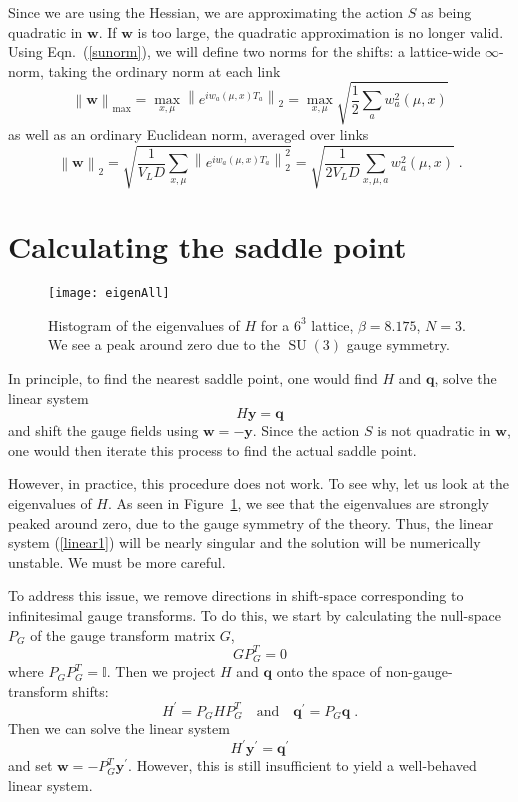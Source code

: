 \documentclass[preprint,aps,prd]{revtex4-2}
\newcommand{\be}{\begin{equation}}
\newcommand{\eq}{\end{equation}}
\DeclareMathOperator{\SU}{SU}
\begin{document}
Since we are using the Hessian, we are approximating
the action $S$ as being quadratic in $\mathbf{w}$.  If $\mathbf{w}$
is too large, the quadratic approximation is no longer valid.
Using Eqn.~(\ref{sunorm}), we will define two norms for the shifts:
a lattice-wide $\infty$-norm, taking the ordinary norm at each link
\be
\left\lVert \mathbf{w}\right\rVert_{\mathrm{max}} =
     \max_{x,\mu} \left\lVert e^{i w_{a}(\mu, x) T_a} \right\rVert_2
     = \max_{x,\mu} \sqrt{\frac{1}{2}\sum_a w_a^2(\mu, x)}
\eq
as well as an ordinary Euclidean norm, averaged over links
\be
\left\lVert \mathbf{w}\right\rVert_2 =
      \sqrt{\frac{1}{V_L D} \sum_{x, \mu}
        \left\lVert e^{i w_{a}(\mu, x) T_a} \right\rVert_2^2}
     = \sqrt{\frac{1}{2 V_L D} \sum_{x, \mu, a} w_a^2(\mu, x)}
        \; .
\eq


\section{Calculating the saddle point}
\label{saddle}

\begin{figure}
\texttt{[image: eigenAll]}
\caption{Histogram of the eigenvalues of $H$ for a $6^3$ lattice,
  $\beta = 8.175$, $N=3$.  We see a peak around zero due to the
  $\SU(3)$ gauge symmetry.
  \label{eigenAll}}
\end{figure}

In principle, to find the nearest saddle point, one would
find $H$ and $\mathbf{q}$, solve the linear system
\be
    H \mathbf{y} = \mathbf{q} \label{linear1}
\eq
and shift the gauge fields using $\mathbf{w} = -\mathbf{y}$.
Since the action $S$ is not quadratic in $\mathbf{w}$, one
would then iterate this process to find the actual saddle point.

However, in practice, this procedure does not work.  To see why, let us
look at the eigenvalues of $H$.  As seen in Figure~\ref{eigenAll},
we see that the eigenvalues are strongly peaked around zero,
due to the gauge symmetry of the theory.  Thus, the linear
system (\ref{linear1}) will be nearly singular and
the solution will be numerically unstable.  We must be more careful.

To address this issue, we remove directions in shift-space corresponding
to infinitesimal gauge transforms.  To do this, we start
by calculating the null-space $P_G$ of the gauge transform matrix $G$,
\be
G P_G^T = 0
\eq
where $P_G P_G^T = \mathbb{I}$.  Then we project $H$ and $\mathbf{q}$ onto
the space of non-gauge-transform shifts:
\be
         H^\prime = P_G H P_G^T \quad \mbox{and} \quad
         \mathbf{q}^\prime = P_G \mathbf{q} \; .
\eq
Then we can solve the linear system
\be
   H^\prime \mathbf{y}^\prime = \mathbf{q}^\prime \label{linear2}
\eq
and set $\mathbf{w} = - P_G^T \mathbf{y}^\prime$.  However, this is
still insufficient to yield a well-behaved linear system.
\end{document}
